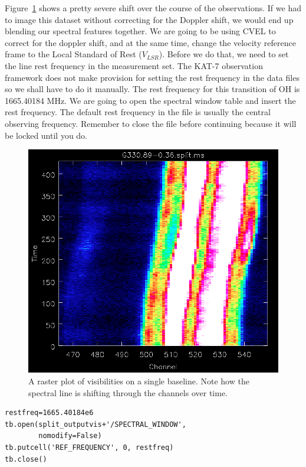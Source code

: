\documentclass[force,almostfull,justified]{tufte-book}
\begin{document}

Figure~\ref{fig:doppler} shows a pretty severe shift over the course of
the observations.  If we had to image this dataset without correcting
for the Doppler shift, we would end up blending our spectral features
together. We are going to be using CVEL to correct for the doppler
shift, and at the same time, change the velocity reference frame to the
Local Standard of Rest ($V_{LSR}$).  Before we do that, we need to set
the line rest frequency in the measurement set.  The KAT-7 observation
framework does not make provision for setting the rest frequency in the
data files so we shall have to do it manually.  The rest frequency for
this transition of OH is 1665.40184 MHz. We are going to open the
spectral window table and insert the rest frequency.  The default rest
frequency in the file is usually the central observing frequency.
Remember to close the file before continuing because it will be locked
until you do.

\begin{figure}
  \includegraphics[width=\textwidth]{images/doppler_shift}
  \caption[]{A raster plot of visibilities on a single baseline. Note
how the spectral line is shifting through the channels over time.}
  \forceversofloat
  \label{fig:doppler}
\end{figure}

\begin{casacmd}
\begin{verbatim}
restfreq=1665.40184e6
tb.open(split_outputvis+'/SPECTRAL_WINDOW',
        nomodify=False)
tb.putcell('REF_FREQUENCY', 0, restfreq)
tb.close()
\end{verbatim}
\end{casacmd}
\end{document}
